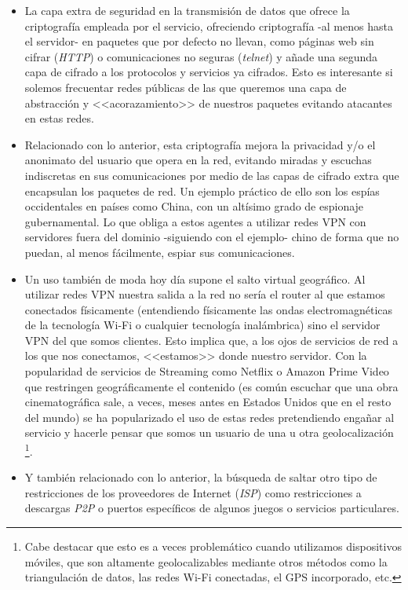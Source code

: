 \documentclass[a4paper, 11pt, titlepage]{article}
\begin{document}
\begin{enumerate}
            \begin{itemize}
                \item La capa extra de seguridad en la transmisión de datos que ofrece la criptografía empleada por el 
                servicio, ofreciendo criptografía -al menos hasta el servidor- en paquetes que por defecto no llevan, 
                como páginas web sin cifrar (\textit{HTTP}) o comunicaciones no seguras (\textit{telnet}) y añade una segunda
                capa de cifrado a los protocolos y servicios ya cifrados. Esto es 
                interesante si solemos frecuentar redes públicas de las que queremos una capa de abstracción y 
                <<acorazamiento>> de nuestros paquetes evitando atacantes en estas redes.
                \item Relacionado con lo anterior, esta criptografía mejora la privacidad y/o el anonimato del usuario
                que opera en la red, evitando miradas y escuchas indiscretas en sus comunicaciones por medio de las capas
                de cifrado extra que encapsulan los paquetes de red. Un ejemplo práctico de ello son los espías occidentales
                en países como China, con un altísimo grado de espionaje gubernamental. Lo que obliga a estos agentes a 
                utilizar redes VPN con servidores fuera del dominio -siguiendo con el ejemplo- chino de forma que no puedan,
                al menos fácilmente, espiar sus comunicaciones.
                \item Un uso también de moda hoy día supone el salto virtual geográfico. Al utilizar redes VPN nuestra salida
                a la red no sería el router al que estamos conectados físicamente (entendiendo físicamente las ondas 
                electromagnéticas de la tecnología Wi-Fi o cualquier tecnología inalámbrica) sino el servidor VPN del que somos 
                clientes. Esto implica que, a los ojos de servicios de red a los que nos conectamos, <<estamos>> donde nuestro
                servidor. 
                Con la popularidad de servicios de Streaming como Netflix o Amazon Prime Video que restringen geográficamente
                el contenido (es común escuchar que una obra cinematográfica sale, a veces, meses antes en Estados Unidos que
                en el resto del mundo) se ha popularizado el uso de estas redes pretendiendo engañar al servicio y hacerle pensar
                que somos un usuario de una u otra geolocalización \footnote{Cabe destacar que esto es a veces problemático cuando
                utilizamos dispositivos móviles, que son altamente geolocalizables mediante otros métodos como la triangulación de 
                datos, las redes Wi-Fi conectadas, el GPS incorporado, etc.}.
                \item Y también relacionado con lo anterior, la búsqueda de saltar otro tipo de restricciones de los proveedores de
                Internet (\textit{ISP}) como restricciones a descargas \textit{P2P} o puertos específicos de algunos juegos o 
                servicios particulares.
            \end{itemize}


\end{enumerate}
\end{document}
